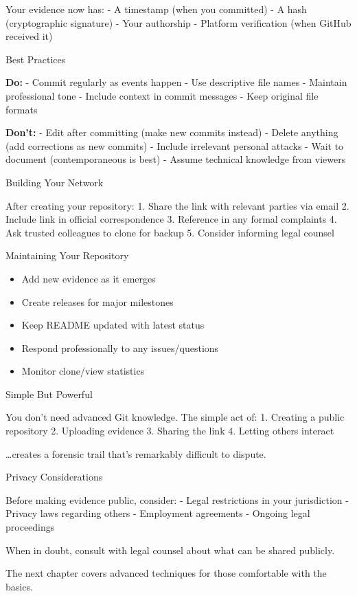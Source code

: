 Your evidence now has: - A timestamp (when you committed) - A hash
(cryptographic signature) - Your authorship - Platform verification
(when GitHub received it)

Best Practices

\textbf{Do:} - Commit regularly as events happen - Use descriptive file
names - Maintain professional tone - Include context in commit messages
- Keep original file formats

\textbf{Don't:} - Edit after committing (make new commits instead) -
Delete anything (add corrections as new commits) - Include irrelevant
personal attacks - Wait to document (contemporaneous is best) - Assume
technical knowledge from viewers

Building Your Network

After creating your repository: 1. Share the link with relevant parties
via email 2. Include link in official correspondence 3. Reference in any
formal complaints 4. Ask trusted colleagues to clone for backup 5.
Consider informing legal counsel

Maintaining Your Repository

\begin{itemize}
\tightlist
\item
  Add new evidence as it emerges
\item
  Create releases for major milestones
\item
  Keep README updated with latest status
\item
  Respond professionally to any issues/questions
\item
  Monitor clone/view statistics
\end{itemize}

Simple But Powerful

You don't need advanced Git knowledge. The simple act of: 1. Creating a
public repository 2. Uploading evidence 3. Sharing the link 4. Letting
others interact

\ldots creates a forensic trail that's remarkably difficult to dispute.

Privacy Considerations

Before making evidence public, consider: - Legal restrictions in your
jurisdiction - Privacy laws regarding others - Employment agreements -
Ongoing legal proceedings

When in doubt, consult with legal counsel about what can be shared
publicly.

The next chapter covers advanced techniques for those comfortable with
the basics.

